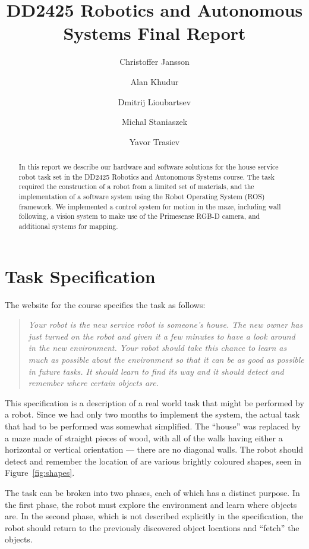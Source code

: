 \documentclass[10pt,a4paper]{article}
\author{Christoffer Jansson \and Alan Khudur \and Dmitrij Lioubartsev \and Michal Staniaszek \and Yavor Trasiev}
\title{DD2425 Robotics and Autonomous Systems Final Report}
\begin{document}
\maketitle
\begin{abstract}
  In this report we describe our hardware and software solutions for the house
  service robot task set in the DD2425 Robotics and Autonomous Systems course.
  The task required the construction of a robot from a limited set of materials,
  and the implementation of a software system using the Robot Operating System
  (ROS)\cite{rosorg} framework. We implemented a control system for motion in
  the maze, including wall following, a vision system to make use of the
  Primesense RGB-D camera, and additional systems for mapping.
\end{abstract}
\section{Task Specification}
The website for the course specifies the task as follows:
\begin{quote}
  \emph{Your robot is the new service robot is someone's house. The new owner has just
  turned on the robot and given it a few minutes to have a look around in the
  new environment. Your robot should take this chance to learn as much as
  possible about the environment so that it can be as good as possible in future
  tasks. It should learn to find its way and it should detect and remember where
  certain objects are.}
\end{quote}
This specification is a description of a real world task that might be performed
by a robot. Since we had only two months to implement the system, the actual
task that had to be performed was somewhat simplified. The ``house'' was
replaced by a maze made of straight pieces of wood, with all of the walls having
either a horizontal or vertical orientation --- there are no diagonal walls. The
robot should detect and remember the location of are various brightly coloured
shapes, seen in Figure~\ref{fig:shapes}.

The task can be broken into two phases, each of which has a distinct purpose. In
the first phase, the robot must explore the environment and learn where objects
are. In the second phase, which is not described explicitly in the
specification, the robot should return to the previously discovered object
locations and ``fetch'' the objects.
\end{document}
